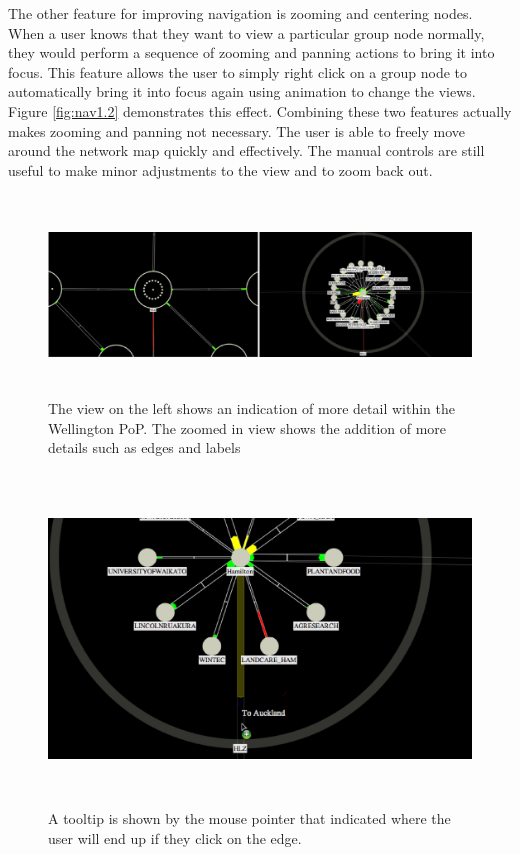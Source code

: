 \documentclass[11pt, a4paper]{article}
\begin{document}
The other feature for improving navigation is zooming and centering nodes. When
a user knows that they want to view a particular group node normally, they would
perform a sequence of zooming and panning actions to bring it into focus. This
feature allows the user to simply right click on a group node to automatically
bring it into focus again using animation to change the views. Figure
\ref{fig:nav1.2} demonstrates this effect. Combining these two features actually
makes zooming and panning not necessary. The user is able to freely move around
the network map quickly and effectively. The manual controls are still useful to
make minor adjustments to the view and to zoom back out.

\begin{figure}
\centering
\includegraphics[width=170mm,height=53mm]{assets/nav1-0.eps}
\caption{The view on the left shows an indication of more detail within the
Wellington PoP. The zoomed in view shows the addition of more details such 
as edges and labels}
\label{fig:nav1.0}
\end{figure}

\begin{figure}
\centering
\includegraphics[width=170mm,height=88.01mm]{assets/nav1-1.eps}
\caption{A tooltip is shown by the mouse pointer that indicated where the user
will end up if they click on the edge.}
\label{fig:nav1.1}
\end{figure}
\end{document}
